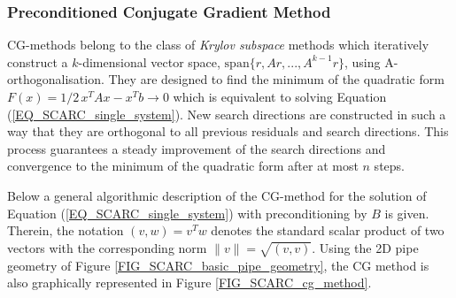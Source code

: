 \subsubsection{Preconditioned Conjugate Gradient Method}
\label{SEC_SCARC_cg}

CG-methods belong to the class of {\it Krylov subspace} methods which iteratively construct a $k$-dimensional vector space, 
$\mbox{span}\{r,Ar,...,A^{k-1}r\}$, using A-orthogonalisation. They are designed to find the minimum of the quadratic form $F(x)=1/2\, x^T A x - x^T b \rightarrow 0$ which is equivalent to solving Equation (\ref{EQ_SCARC_single_system}). 
New search directions are constructed in such a way that they are orthogonal to all previous residuals and search directions. This process guarantees a steady improvement of the search directions and convergence to the minimum of the quadratic form after at most $n$ steps. %

Below a general algorithmic description of the CG-method for the solution of Equation (\ref{EQ_SCARC_single_system}) with preconditioning by $B$ is given.
Therein, the notation $(v,w)=v^T w$ denotes the standard scalar product of two vectors with the corresponding norm $\|v\| =\sqrt{(v,v)}$.
Using the 2D pipe geometry of Figure \ref{FIG_SCARC_basic_pipe_geometry}, the CG method is also graphically represented in Figure \ref{FIG_SCARC_cg_method}.

